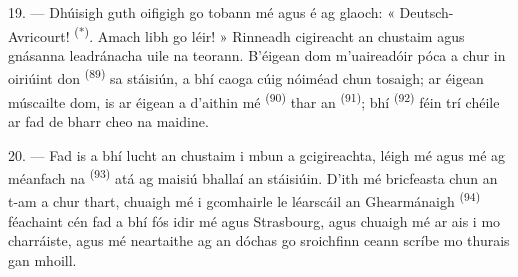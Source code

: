 19. --- Dhúisigh guth oifigigh go tobann mé agus é ag glaoch: « Deutsch-Avricourt!
\textsuperscript{(*)}. Amach libh go léir! » Rinneadh cigireacht an chustaim agus
gnásanna leadránacha uile na teorann. B'éigean dom m'uaireadóir póca a chur in
oiriúint don  \textsuperscript{(89)} sa stáisiún, a bhí caoga cúig
nóiméad chun tosaigh; ar éigean múscailte dom, is ar éigean a d'aithin mé
 \textsuperscript{(90)} thar an 
\textsuperscript{(91)}; bhí  \textsuperscript{(92)} féin
trí chéile ar fad de bharr cheo na maidine.

20. --- Fad is a bhí lucht an chustaim i mbun a gcigireachta, léigh mé agus mé ag
méanfach na  \textsuperscript{(93)} atá ag maisiú bhallaí an
stáisiúin. D'ith mé bricfeasta chun an t-am a chur thart, chuaigh mé i gcomhairle le
léarscáil an  Ghearmánaigh \textsuperscript{(94)} féachaint cén fad a bhí
fós idir mé agus Strasbourg, agus chuaigh mé ar ais i mo charráiste, agus mé
neartaithe ag an dóchas go sroichfinn ceann scríbe mo thurais gan mhoill.
